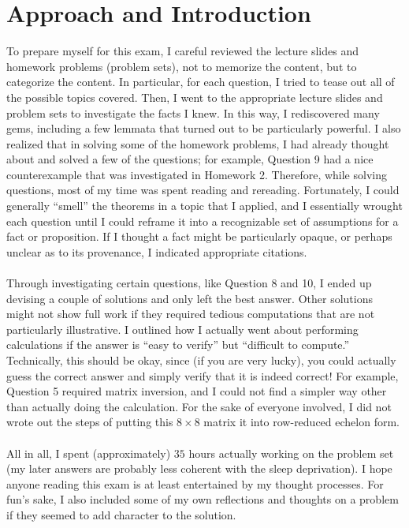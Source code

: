 \documentclass[letterpaper]{article}
\begin{document}
\section*{Approach and Introduction}
To prepare myself for this exam, I careful reviewed the lecture slides and homework problems (problem sets), not to memorize the content, but to categorize the content.
In particular, for each question, I tried to tease out all of the possible topics covered.
Then, I went to the appropriate lecture slides and problem sets to investigate the facts I knew.
In this way, I rediscovered many gems, including a few lemmata that turned out to be particularly powerful.
I also realized that in solving some of the homework problems, I had already thought about and solved a few of the questions; for example, Question 9 had a nice counterexample that was investigated in Homework 2.
Therefore, while solving questions, most of my time was spent reading and rereading.
Fortunately, I could generally ``smell'' the theorems in a topic that I applied, and I essentially wrought each question until I could reframe it into a recognizable set of assumptions for a fact or proposition.
If I thought a fact might be particularly opaque, or perhaps unclear as to its provenance, I indicated appropriate citations.
\\ \\
Through investigating certain questions, like Question 8 and 10, I ended up devising a couple of solutions and only left the best answer.
Other solutions might not show full work if they required tedious computations that are not particularly illustrative.
I outlined how I actually went about performing calculations if the answer is ``easy to verify'' but ``difficult to compute.''
Technically, this should be okay, since (if you are very lucky), you could actually guess the correct answer and simply verify that it is indeed correct!
For example, Question 5 required matrix inversion, and I could not find a simpler way other than actually doing the calculation.
For the sake of everyone involved, I did not wrote out the steps of putting this $ 8 \times 8 $ matrix it into row-reduced echelon form.
\\ \\
All in all, I spent (approximately) $ 35 $ hours actually working on the problem set (my later answers are probably less coherent with the sleep deprivation).
I hope anyone reading this exam is at least entertained by my thought processes.
For fun's sake, I also included some of my own reflections and thoughts on a problem if they seemed to add character to the solution.
\end{document}
